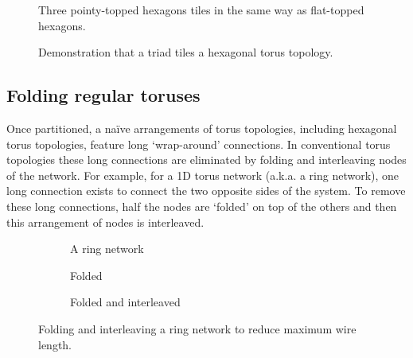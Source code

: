 			\begin{figure}
				\center
				
				\caption{Three pointy-topped hexagons tiles in the same way as flat-topped
				hexagons.}
				\label{fig:wrapped-triple-tiling}
			\end{figure}
			
			\begin{figure}
				\center
				
				\caption{Demonstration that a triad tiles a hexagonal torus topology.}
				\label{fig:triad-tiling}
			\end{figure}
		
		\subsection{Folding regular toruses}
			
			Once partitioned, a na\"ive arrangements of torus topologies, including
			hexagonal torus topologies, feature long `wrap-around' connections. In
			conventional torus topologies these long connections are eliminated by
			folding and interleaving nodes of the network. For example, for a 1D
			torus network (a.k.a. a ring network), one long connection exists to
			connect the two opposite sides of the system. To remove these long
			connections, half the nodes are `folded' on top of the others and then
			this arrangement of nodes is interleaved.
			
			\begin{figure}
				\center
				\begin{subfigure}[b]{0.39\linewidth}
					\center
					\caption{A ring network}
					\label{fig:ring-folding-row}
				\end{subfigure}
				\begin{subfigure}[b]{0.24\linewidth}
					\center
					\caption{Folded}
					\label{fig:ring-folding-folded}
				\end{subfigure}
				\begin{subfigure}[b]{0.35\linewidth}
					\center
					\caption{Folded and interleaved}
					\label{fig:ring-folding-interleaved}
				\end{subfigure}
				
				\caption{Folding and interleaving a ring network to reduce maximum wire
				length.}
				\label{fig:ring-folding}
			\end{figure}
			
